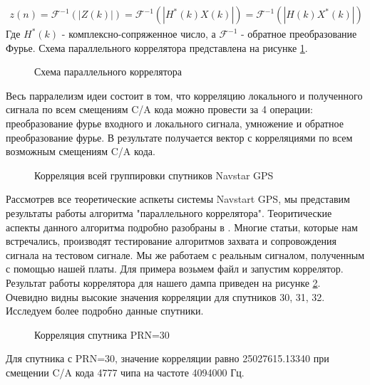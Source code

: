 \documentclass[a4paper,12pt]{article}
\numberwithin{table}{section}
\begin{document}
\begin{eqnarray}
	z(n)	= \mathcal{F}^{-1}(\left|{Z(k)}\right|)
		= \mathcal{F}^{-1}(\left|{H^*(k)X(k)}\right|)
		= \mathcal{F}^{-1}(\left|{H(k)X^*(k)}\right|)
\label{eq:par_corr}
\end{eqnarray}
Где ${H^*(k)}$ - комплексно-сопряженное число, а ${\mathcal{F}^{-1}}$ - обратное преобразование Фурье. Схема параллельного коррелятора
представлена на рисунке \ref{pic:par_corr}.
\begin{figure}[h]
\begin{center}
\end{center}
\caption{Схема параллельного коррелятора}
\label{pic:par_corr}
\end{figure}
Весь парралелизм идеи состоит в том, что корреляцию локального и полученного сигнала по всем смещениям C/A кода
можно провести за 4 операции: преобразование фурье входного и локального сигнала, умножение и обратное преобразование
фурье. В результате получается вектор с корреляциями по всем возможным смещениям C/A кода.

\begin{figure}[h]
\begin{center}
\end{center}
\caption{Корреляция всей группировки спутников Navstar GPS}
\label{pic:corr_bar}
\end{figure}

Рассмотрев все теоретические аспкеты системы Navstart GPS, мы представим результаты работы алгоритма "параллельного коррелятора".
Теоритические аспекты данного алгоритма подробно разобраны в \cite{tsui, akos-book}. Многие статьи, которые нам встречались,
производят тестирование алгоритмов захвата и сопровождения сигнала на тестовом сигнале. Мы же работаем с реальным сигналом,
полученным с помощью нашей платы. Для примера возьмем файл и запустим коррелятор. Результат работы коррелятора для нашего
дампа приведен на рисунке \ref{pic:corr_bar}. Очевидно видны высокие значения корреляции для спутников 30, 31, 32.
Исследуем более подробно данные спутники.
\begin{figure}[h]
\begin{center}
\end{center}
\caption{Корреляция спутника PRN=30}
\label{pic:corr_30}
\end{figure}
Для спутника с PRN=30, значение корреляции равно 25027615.13340 при смещении C/A кода 4777 чипа на частоте 4094000 Гц.
\end{document}
